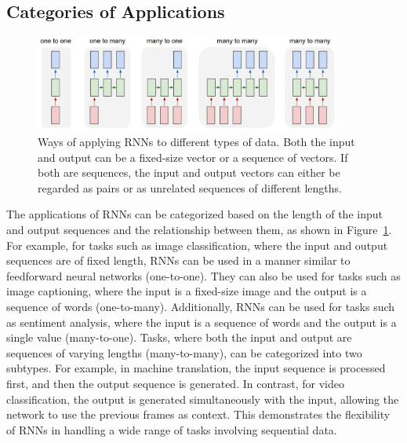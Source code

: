 \documentclass{article}
\newcommand{\reffig}[1]{Figure~\ref{#1}}
\begin{document}
\subsection{Categories of Applications}
\label{sec:2.0}

\begin{figure}[htbp]
  \centering
  \includegraphics[width=0.9\textwidth]{Karpathy application types.jpeg}
  \caption{Ways of applying RNNs to different types of data. Both the input and output can
    be a fixed-size vector or a sequence of vectors. If both are sequences, the input and
    output vectors can either be regarded as pairs or as unrelated sequences of different
    lengths. \cite{karpathyUnreasonableEffectivenessRecurrent}}
  \label{fig:rnn-application-types}
\end{figure}

The applications of RNNs can be categorized based on the length of the input and output
sequences and the relationship between them, as shown in
\reffig{fig:rnn-application-types}. For example, for tasks such as image classification,
where the input and output sequences are of fixed length, RNNs can be used in a manner
similar to feedforward neural networks (one-to-one). They can also be used for tasks such
as image captioning, where the input is a fixed-size image and the output is a sequence of
words (one-to-many). Additionally, RNNs can be used for tasks such as sentiment analysis,
where the input is a sequence of words and the output is a single value (many-to-one).
Tasks, where both the input and output are sequences of varying lengths (many-to-many),
can be categorized into two subtypes. For example, in machine translation, the input
sequence is processed first, and then the output sequence is generated. In contrast, for
video classification, the output is generated simultaneously with the input, allowing the
network to use the previous frames as context. This demonstrates the flexibility of RNNs
in handling a wide range of tasks involving sequential data.

\end{document}
